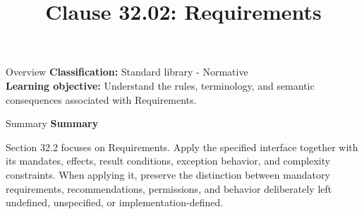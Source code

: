 \documentclass[10pt,letterpaper]{article}
\title{Clause 32.02: Requirements}
\author{}
\date{}
\begin{document}
\maketitle
\begin{CornellOverviewBox}{Overview}
\textbf{Classification:} Standard library - Normative\\[2pt]
\textbf{Learning objective:} Understand the rules, terminology, and semantic consequences associated with Requirements.
\end{CornellOverviewBox}\begin{CornellSummaryBox}{Summary}
{\sffamily\bfseries\color{Accent} Summary}\par\vspace{3pt}Section 32.2 focuses on Requirements. Apply the specified interface together with its mandates, effects, result conditions, exception behavior, and complexity constraints. When applying it, preserve the distinction between mandatory requirements, recommendations, permissions, and behavior deliberately left undefined, unspecified, or implementation-defined.
\end{CornellSummaryBox}
\end{document}
